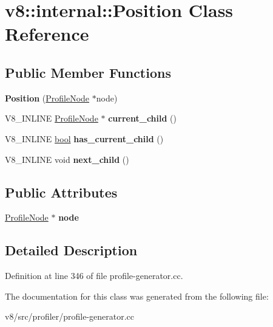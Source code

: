 \hypertarget{classv8_1_1internal_1_1Position}{}\section{v8\+:\+:internal\+:\+:Position Class Reference}
\label{classv8_1_1internal_1_1Position}
\subsection*{Public Member Functions}
\begin{DoxyCompactItemize}
\item 
\mbox{\label{classv8_1_1internal_1_1Position_abe904a2351771f5689f89c648353c29c}} 
{\bfseries Position} (\mbox{\hyperlink{classv8_1_1internal_1_1ProfileNode}{Profile\+Node}} $\ast$node)
\item 
\mbox{\label{classv8_1_1internal_1_1Position_ab228b73b503705ffd6e64c2de6461852}} 
V8\+\_\+\+I\+N\+L\+I\+NE \mbox{\hyperlink{classv8_1_1internal_1_1ProfileNode}{Profile\+Node}} $\ast$ {\bfseries current\+\_\+child} ()
\item 
\mbox{\label{classv8_1_1internal_1_1Position_acb21ba7e785bb404f52456a6ad74ab3e}} 
V8\+\_\+\+I\+N\+L\+I\+NE \mbox{\hyperlink{classbool}{bool}} {\bfseries has\+\_\+current\+\_\+child} ()
\item 
\mbox{\label{classv8_1_1internal_1_1Position_a2beb9832d82901c63c1e1862fabaff93}} 
V8\+\_\+\+I\+N\+L\+I\+NE void {\bfseries next\+\_\+child} ()
\end{DoxyCompactItemize}
\subsection*{Public Attributes}
\begin{DoxyCompactItemize}
\item 
\mbox{\label{classv8_1_1internal_1_1Position_a59842d5a15c7578368190dccf7aa323a}} 
\mbox{\hyperlink{classv8_1_1internal_1_1ProfileNode}{Profile\+Node}} $\ast$ {\bfseries node}
\end{DoxyCompactItemize}


\subsection{Detailed Description}


Definition at line 346 of file profile-\/generator.\+cc.



The documentation for this class was generated from the following file\+:\begin{DoxyCompactItemize}
\item 
v8/src/profiler/profile-\/generator.\+cc\end{DoxyCompactItemize}
